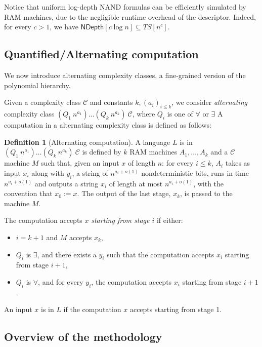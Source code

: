 \documentclass[a4paper, 11pt]{article}
\theoremstyle{plain}
\theoremstyle{definition}
\newtheorem{definition}[theorem]{Definition}
\theoremstyle{remark}
\newcommand{\Cc}{\mathcal{C}}%
\newcommand{\ND}{\textsf{NDepth}}%
\newcommand{\NDL}[1]{\ND\left[ #1 \log n\right]}%
\begin{document}
Notice that uniform log-depth NAND formulas
can be efficiently simulated by RAM machines, 
due to the negligible runtime overhead of the descriptor.
Indeed, for every $c > 1$, we have $\NDL{c} \subseteq TS[n^c]$.

\subsection{Quantified/Alternating computation}

We now introduce alternating complexity classes, a fine-grained version of the polynomial hierarchy.

Given a complexity class $\Cc$ and constants $k, (a_i)_{i\leq k}$, 
we consider \textit{alternating} complexity
class $(Q_1~n^{a_1})\ldots(Q_k~n^{a_k})~\Cc$, 
where $Q_i$ is one of $\forall$ or $\exists$
A computation in a alternating complexity class is defined as follows:
\begin{definition}[Alternating computation]
	A language $L$ is in $(Q_1~n^{a_1})\ldots(Q_k~n^{a_k})~\Cc$ 
	is defined by $k$ RAM machines $A_1, \ldots, A_k$ and a $\Cc$ machine $M$
	such that, given an input $x$ of length $n$:
	for every $i \le k$, $A_{i}$ takes as input $x_i$ along with $y_i$, 
	a string of $n^{a_{i} + o(1)}$ nondeterministic bits,
	runs in time $n^{a_{i} + o(1)}$ and outputs a string $x_{i}$ of length at most $n^{a_{i} + o(1)}$, 
	with the convention that $x_0 := x$.
	The output of the last stage, $x_{k}$, is passed to the machine $M$. 

	The computation accepts $x$ \textit{starting from stage $i$} if either:
	\begin{itemize}
		\item $i = k+1$ and $M$ accepts $x_{k}$, 
		\item $Q_i$ is $\exists$, and there exists a $y_i$ such that the computation
		accepts $x_{i}$ starting from stage $i+1$, 
		\item $Q_i$ is $\forall$, and for every $y_i$, the computation
		accepts $x_{i}$ starting from stage $i+1$. 
	\end{itemize}

	An input $x$ is in $L$ if the computation $x$ accepts starting from stage 1.
\end{definition}

\subsection{Overview of the methodology}\label{sec:overview}
\end{document}
